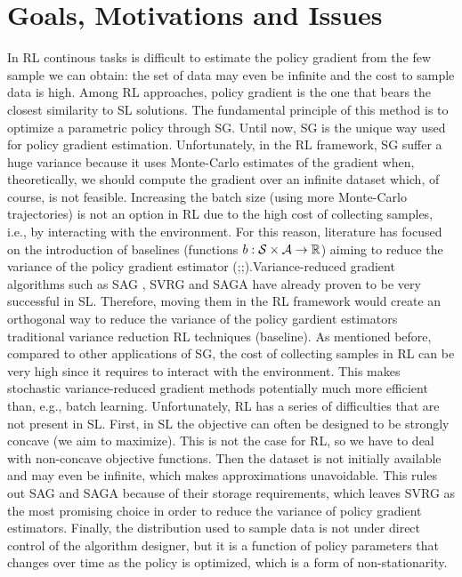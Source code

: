 \section{Goals, Motivations and Issues}
In \acs{RL} continous tasks is difficult to estimate the policy gradient from the few sample we can obtain: the set of data may even be infinite and the cost to sample data is high.
Among \acs{RL} approaches, policy gradient is the one that bears the closest similarity to \acs{SL} solutions. The fundamental principle of this method is to optimize a parametric policy through \acs{SG}.
Until now, \acs{SG} is the unique way used for policy gradient estimation. Unfortunately, in the \acs{RL} framework, \acs{SG} suffer a huge variance because it uses Monte-Carlo estimates of the gradient when, theoretically, we should compute the gradient over an infinite dataset which, of course, is not feasible. Increasing the batch size (using more Monte-Carlo trajectories) is not an option in \acs{RL} due to the high cost of collecting samples, i.e., by interacting with the environment. For this reason, literature has focused on the introduction of baselines  (\ie functions $b : \mathcal{S} \times \mathcal{A} \to \mathbb R$) aiming to reduce the variance of the policy gradient estimator (\cite{williams1992simple};\cite{peters2008reinforcement};\cite{thomas2017policy}).\newline Variance-reduced gradient algorithms such as \acs{SAG} \citep{roux2012stochastic}, \acs{SVRG} \citep{allen2016variance} and \acs{SAGA} \citep{defazio2014saga} have already proven to be very successful in \acs{SL}. Therefore, moving them in the \acs{RL} framework would create an orthogonal way to reduce the variance of the policy gardient estimators \wrt traditional variance reduction \acs{RL} techniques (\eg baseline).\newline
As mentioned before, compared to other applications of \acs{SG}, the cost of collecting samples in \acs{RL} can be very high since it requires to interact with the environment.
This makes stochastic variance-reduced gradient methods potentially much more efficient than, e.g., batch learning. 
Unfortunately, \acs{RL} has a series of difficulties that are not present in \acs{SL}. First, in \acs{SL} the objective can often be designed to be strongly concave (we aim to maximize). This is not the case for \acs{RL}, so we have to deal with non-concave objective functions. Then the dataset is not initially available and may even be infinite, which makes approximations unavoidable. This rules out \acs{SAG} and \acs{SAGA} because of their storage requirements, which leaves \acs{SVRG} as the most promising choice in order to reduce the variance of policy gradient estimators.
Finally, the distribution used to sample data is not under direct control of the algorithm designer, but it is a function of policy parameters that changes over time as the policy is optimized, which is a form of non-stationarity.
